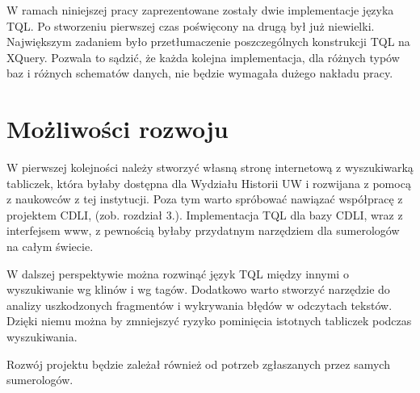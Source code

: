 W ramach niniejszej pracy zaprezentowane zostały dwie implementacje języka TQL. 
Po stworzeniu pierwszej czas poświęcony na drugą był już niewielki. 
Największym zadaniem było przetłumaczenie poszczególnych konstrukcji TQL na XQuery. 
Pozwala to sądzić, że każda kolejna implementacja, dla różnych typów baz i różnych schematów danych, 
nie będzie wymagała dużego nakładu pracy. 



\section*{Możliwości rozwoju}
W pierwszej kolejności należy stworzyć własną stronę internetową z wyszukiwarką tabliczek, 
która byłaby dostępna dla Wydziału Historii UW i rozwijana z pomocą z naukowców z tej instytucji. 
Poza tym warto spróbować nawiązać współpracę z projektem CDLI, (zob. rozdział 3.).
Implementacja TQL dla bazy CDLI, wraz z interfejsem www, z pewnością byłaby przydatnym narzędziem dla sumerologów na całym świecie.

W dalszej perspektywie można rozwinąć język TQL między innymi o wyszukiwanie wg klinów i wg tagów.
Dodatkowo warto stworzyć narzędzie do analizy uszkodzonych fragmentów i wykrywania błędów w odczytach tekstów. 
Dzięki niemu można by zmniejszyć ryzyko pominięcia istotnych tabliczek podczas wyszukiwania. 

Rozwój projektu będzie zależał również od potrzeb zgłaszanych przez samych sumerologów.
